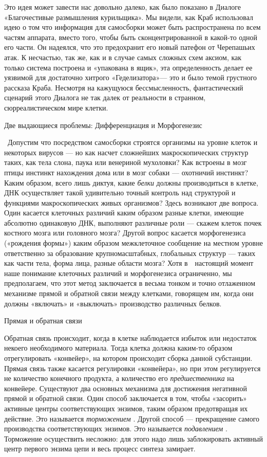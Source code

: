 Это идея может завести нас довольно далеко, как было показано в Диалоге «Благочестивые размышления курильщика». Мы видели, как Краб использовал идею о том что информация для самосборки может быть распространена по всем частям аппарата, вместо того, чтобы быть сконцентрированной в какой-то одной его части. Он надеялся, что это предохранит его новый патефон от Черепашьих атак. К несчастью, так же, как и в случае самых сложных схем аксиом, как только система построена и «упакована в ящик», эта определенность делает ее уязвимой для достаточно хитрого «Геделизатора»--- это и было темой грустного рассказа Краба. Несмотря на кажущуюся бессмысленность, фантастический сценарий этого Диалога не так далек от реальности в странном, сюрреалистическом мире клетки.

Две выдающиеся проблемы: Дифференциация и Морфогенезис

~Допустим что посредством самосборки строятся организмы на уровне клеток и некоторых вирусов --- но как насчет сложнейших макроскопических структур таких, как тела слона, паука или венериной мухоловки? Как встроены в мозг птицы инстинкт нахождения дома или в мозг собаки --- охотничий инстинкт? Каким образом, всего лишь диктуя, какие \emph{белки} должны производиться в клетке, ДНК осуществляет такой удивительно точный контроль над структурой и функциями макроскопических живых организмов? Здесь возникают две вопроса. Один касается клеточных различий каким образом разные клетки, имеющие абсолютно одинаковую ДНК, выполняют различные роли --- скажем клеток почек костного мозга или головного мозга? Другой вопрос касается морфогенезиса («рождения формы») каким образом межклеточное сообщение на местном уровне ответственно за образование крупномасштабных, глобальных структур --- таких как части тела, форма лица, разные области мозга? Хотя в~~настоящий момент наше понимание клеточных различий и морфогенезиса ограниченно, мы предполагаем, что этот метод заключается в весьма тонком и точно отлаженном механизме прямой и обратной связи между клетками, говорящем им, когда они должны «включать» и «выключать» производство различных белков.

Прямая и обратная связи

Обратная связь происходит, когда в клетке наблюдается избыток или недостаток некоего необходимого материала. Тогда клетка должна каким-то образом отрегулировать «конвейер», на котором происходит сборка данной субстанции. Прямая связь также касается регулировки «конвейера», но при этом регулируется не количество конечного продукта, а количество его \emph{предшественника} на конвейере. Существуют два основных механизма для достижения негативной прямой и обратной связи. Один способ заключается в том, чтобы «засорить» активные центры соответствующих энзимов, таким образом предотвращая их действие. Это называется \emph{торможением} . Другой способ --- прекращение самого производства соответствующих энзимов. Это называется \emph{подавлением} . Торможение осуществить несложно: для этого надо лишь заблокировать активный центр первого энзима цепи и весь процесс синтеза замирает.

